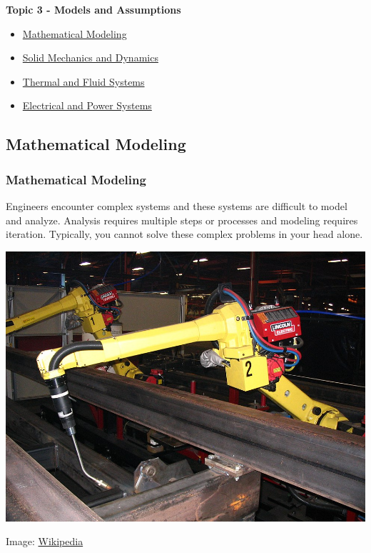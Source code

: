 \documentclass[fleqn]{beamer} %
\newcommand{\sectionIIItitle}{Models and Assumptions}
\newcommand{\sectionIIIsubsectionItitle}{Mathematical Modeling}
\newcommand{\sectionIIIsubsectionIItitle}{Solid Mechanics and Dynamics}
\newcommand{\sectionIIIsubsectionIIItitle}{Thermal and Fluid Systems}
\newcommand{\sectionIIIsubsectionIVtitle}{Electrical and Power Systems}
\begin{document}
		\begin{frame}
			\large \textbf{Topic 3 - \sectionIIItitle} \vspace{3mm}\\

			\begin{itemize}
				\item \hyperlink{sectionIIIsubsectionI}{\sectionIIIsubsectionItitle} \vspc %
				\item \hyperlink{sectionIIIsubsectionII}{\sectionIIIsubsectionIItitle} \vspc %
				\item \hyperlink{sectionIIIsubsectionIII}{\sectionIIIsubsectionIIItitle} \vspc %
				\item \hyperlink{sectionIIIsubsectionIV}{\sectionIIIsubsectionIVtitle} \vspc %
			\end{itemize}

		\end{frame}

		\subsection{\sectionIIIsubsectionItitle}\label{sectionIIIsubsectionI}

			\begin{frame}
				\frametitle{\sectionIIIsubsectionItitle}
				\bigskip
				\begin{multicols}{2}
				Engineers encounter complex systems and these systems are difficult to model and analyze.  Analysis requires multiple steps or processes and modeling requires iteration. Typically, you cannot solve these complex problems in your head alone. \vspc

				\includegraphics[scale=.15]{images/fanuc_robot.jpg}
				\end{multicols}
				{\tiny \hspace{60mm} Image: \href{https://en.wikipedia.org/wiki/Articulated_robot}{Wikipedia} }
		
				\btVFill
			\end{frame}
\end{document}
